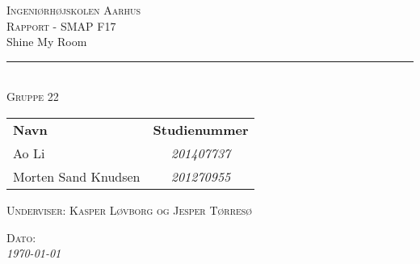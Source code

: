 \thispagestyle{empty}
\newcommand{\HRule}{\rule{\linewidth}{0.1mm}} %

\begin{center}
	\vspace{3cm}
	\textsc{\LARGE Ingeniørhøjskolen Aarhus}\\[1.5cm] %
	
	\textsc{\large Rapport - SMAP F17}\\[2.5cm] 
	

	{\LARGE Shine My Room} \\[0.5cm]
	\HRule \\[1.5cm]
	

	
	\textsc{\large Gruppe 22}\\
	\vspace{0.5 in}
	\begin{center}
		\begin{tabular}{l c}
			\textbf{Navn} & \textbf{Studienummer} \\
			Ao Li & \textsl{201407737}    \\
			Morten Sand Knudsen & \textsl{201270955}  \\
			
		\end{tabular}
	\end{center}
	\vspace{0.5 in}
	
	\textsc{\large Underviser: Kasper Løvborg og Jesper Tørresø}
	\vspace{0.5 in}
	
	\textsc{\large Dato: }\\
	{\large\textit{\today}} \\[3cm]
	\vfill %
	
\end{center} %

\clearpage

\newpage